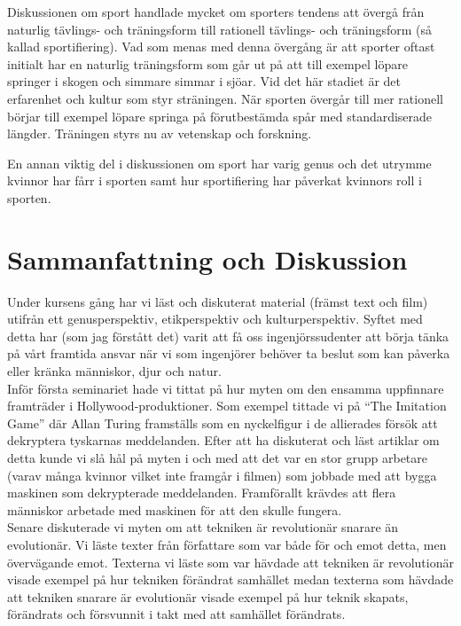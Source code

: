 \documentclass[12pt,a4paper]{article}
\begin{document}
Diskussionen om sport handlade mycket om sporters tendens att övergå från naturlig tävlings- och träningsform till rationell tävlings- och träningsform (så kallad sportifiering).
Vad som menas med denna övergång är att sporter oftast initialt har en naturlig träningsform som går ut på att till exempel löpare springer i skogen och simmare simmar i sjöar.
Vid det här stadiet är det erfarenhet och kultur som styr sträningen.
När sporten övergår till mer rationell börjar till exempel löpare springa på förutbestämda spår med standardiserade längder.
Träningen styrs nu av vetenskap och forskning.

En annan viktig del i diskussionen om sport har varig genus och det utrymme kvinnor har fårr i sporten samt hur sportifiering har påverkat kvinnors roll i sporten.

\section{Sammanfattning och Diskussion}
Under kursens gång har vi läst och diskuterat material (främst text och film) utifrån ett genusperspektiv, etikperspektiv och kulturperspektiv.
Syftet med detta har (som jag förstått det) varit att få oss ingenjörssudenter att börja tänka på vårt framtida ansvar när vi som ingenjörer behöver ta beslut som kan påverka eller kränka människor, djur och natur.\\

\noindent Inför första seminariet hade vi tittat på hur myten om den ensamma uppfinnare framträder i Hollywood-produktioner.
Som exempel tittade vi på ``The Imitation Game'' där Allan Turing framställs som en nyckelfigur i de allierades försök att dekryptera tyskarnas meddelanden.
Efter att ha diskuterat och läst artiklar om detta kunde vi slå hål på myten i och med att det var en stor grupp arbetare (varav många kvinnor vilket inte framgår i filmen) som jobbade med att bygga maskinen som dekrypterade meddelanden.
Framförallt krävdes att flera människor arbetade med maskinen för att den skulle fungera.\\

\noindent Senare diskuterade vi myten om att tekniken är revolutionär snarare än evolutionär.
Vi läste texter från författare som var både för och emot detta, men övervägande emot.
Texterna vi läste som var hävdade att tekniken är revolutionär visade exempel på hur tekniken förändrat samhället medan texterna som hävdade att tekniken snarare är evolutionär visade exempel på hur teknik skapats, förändrats och försvunnit i takt med att samhället förändrats.
\end{document}
